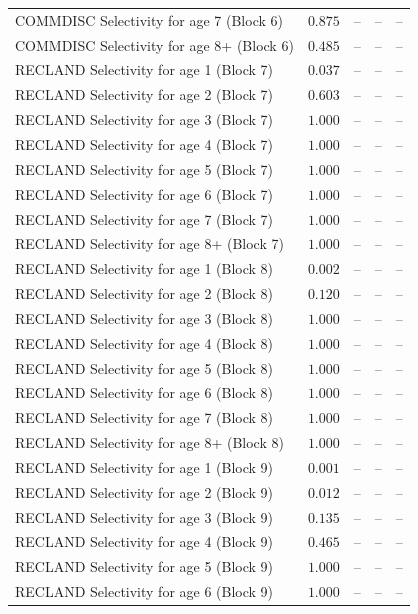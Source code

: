 \documentclass[
]{article}
\begin{document}
\begin{landscape}
\begin{longtable}[t]{lrrrr}
COMMDISC Selectivity for age 7 (Block 6) & $0.875$ & -- & -- & --\\
COMMDISC Selectivity for age 8+ (Block 6) & $0.485$ & -- & -- & --\\
RECLAND Selectivity for age 1 (Block 7) & $0.037$ & -- & -- & --\\
\addlinespace
RECLAND Selectivity for age 2 (Block 7) & $0.603$ & -- & -- & --\\
RECLAND Selectivity for age 3 (Block 7) & $1.000$ & -- & -- & --\\
RECLAND Selectivity for age 4 (Block 7) & $1.000$ & -- & -- & --\\
RECLAND Selectivity for age 5 (Block 7) & $1.000$ & -- & -- & --\\
RECLAND Selectivity for age 6 (Block 7) & $1.000$ & -- & -- & --\\
\addlinespace
RECLAND Selectivity for age 7 (Block 7) & $1.000$ & -- & -- & --\\
RECLAND Selectivity for age 8+ (Block 7) & $1.000$ & -- & -- & --\\
RECLAND Selectivity for age 1 (Block 8) & $0.002$ & -- & -- & --\\
RECLAND Selectivity for age 2 (Block 8) & $0.120$ & -- & -- & --\\
RECLAND Selectivity for age 3 (Block 8) & $1.000$ & -- & -- & --\\
\addlinespace
RECLAND Selectivity for age 4 (Block 8) & $1.000$ & -- & -- & --\\
RECLAND Selectivity for age 5 (Block 8) & $1.000$ & -- & -- & --\\
RECLAND Selectivity for age 6 (Block 8) & $1.000$ & -- & -- & --\\
RECLAND Selectivity for age 7 (Block 8) & $1.000$ & -- & -- & --\\
RECLAND Selectivity for age 8+ (Block 8) & $1.000$ & -- & -- & --\\
\addlinespace
RECLAND Selectivity for age 1 (Block 9) & $0.001$ & -- & -- & --\\
RECLAND Selectivity for age 2 (Block 9) & $0.012$ & -- & -- & --\\
RECLAND Selectivity for age 3 (Block 9) & $0.135$ & -- & -- & --\\
RECLAND Selectivity for age 4 (Block 9) & $0.465$ & -- & -- & --\\
RECLAND Selectivity for age 5 (Block 9) & $1.000$ & -- & -- & --\\
\addlinespace
RECLAND Selectivity for age 6 (Block 9) & $1.000$ & -- & -- & --\\

\end{longtable}
\end{landscape}
\end{document}
